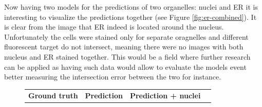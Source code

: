 Now having two models for the predictions of two organelles: nuclei and ER it is interesting to visualize the predictions together (see Figure \ref{fig:er-combined}). It is clear from the image that ER indeed is located around the nucleus. Unfortunately the cells were stained only for separate oragnelles and different fluorescent target do not intersect, meaning there were no images with both nucleus and ER stained together. This would be a field where further research can be applied as having such data would allow to evaluate the models event better measuring the intersection error between the two for instance.
\begin{figure}[htb]
    \centering
    \centering
        \begin{tabularx}{\textwidth}{YYYY}
            \textbf{Ground truth} &
            \textbf{Prediction} &
            \textbf{Prediction + nuclei} \\

\end{tabularx}
\end{figure}
